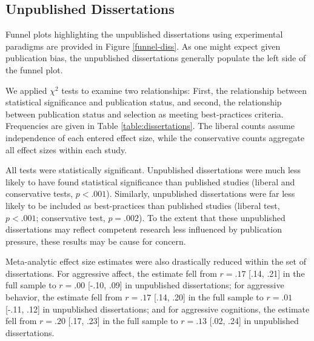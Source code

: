 \documentclass[man]{apa6}
\begin{document}
\subsection{Unpublished Dissertations} %
Funnel plots highlighting the unpublished dissertations using experimental paradigms are provided in Figure \ref{funnel-diss}. As one might expect given publication bias, the unpublished dissertations generally populate the left side of the funnel plot. 

We applied $\chi^2$ tests to examine two relationships: First, the relationship between statistical significance and publication status, and second, the relationship between publication status and selection as meeting best-practices criteria. Frequencies are given in Table \ref{table:dissertations}. The liberal counts assume independence of each entered effect size, while the conservative counts aggregate all effect sizes within each study.

All tests were statistically significant. Unpublished dissertations were much less likely to have found statistical significance than published studies (liberal and conservative tests, $p < .001$).
Similarly, unpublished dissertations were far less likely to be included as best-practices than published studies (liberal test, $p < .001$; conservative test, $p = .002$). 
To the extent that these unpublished dissertations may reflect competent research less influenced by publication pressure, these results may be cause for concern.

Meta-analytic effect size estimates were also drastically reduced within the set of dissertations. For aggressive affect, the estimate fell from $r = .17$ [.14, .21] in the full sample to $r = .00$ [-.10, .09] in unpublished dissertations; for aggressive behavior, the estimate fell from $r = .17$ [.14, .20] in the full sample to $r = .01$ [-.11, .12] in unpublished dissertations; and for aggressive cognitions, the estimate fell from $r = .20$ [.17, .23] in the full sample to $r =  .13$ [.02, .24] in unpublished dissertations.  
\end{document}
